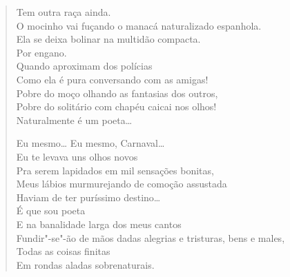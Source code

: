 {\begin{verse}
Tem outra raça ainda.\\
O mocinho vai fuçando o manacá naturalizado espanhola.\\
Ela se deixa bolinar na multidão compacta.\\
\qquad\qquad\qquad\qquad\qquad\qquad\quad Por engano.\\
Quando aproximam dos polícias\\
Como ela é pura conversando com as amigas!\\
Pobre do moço olhando as fantasias dos outros,\\
Pobre do solitário com chapéu caicai nos olhos!\\
Naturalmente é um poeta\ldots{}

Eu mesmo\ldots{} Eu mesmo, Carnaval\ldots{}\\
Eu te levava uns olhos novos\\
Pra serem lapidados em mil sensações bonitas,\\
Meus lábios murmurejando de comoção assustada\\
Haviam de ter puríssimo destino\ldots{}\\
É que sou poeta\\
E na banalidade larga dos meus cantos\\
Fundir"-se"-ão de mãos dadas alegrias e tristuras, bens e males,\\
Todas as coisas finitas\\
Em rondas aladas sobrenaturais.


\end{verse}}
